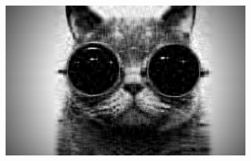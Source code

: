 \begin{figure}[h!]
\begin{subfigure}[c]{.3\textwidth}
\end{subfigure}
\begin{subfigure}[c]{.3\textwidth}
\includegraphics[width=.9\linewidth]{images/Cat20}
\end{subfigure}


\end{figure}

